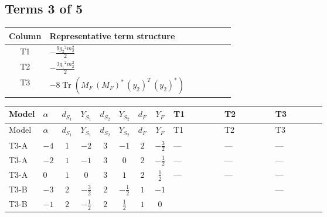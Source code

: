 \documentclass[8pt]{article}
\begin{document}
\begin{landscape}
\subsection*{Terms 3 of 5}
\begin{center}
\begin{tabular}{@{}c >{\raggedright\arraybackslash}p{0.82\linewidth}@{}}
\toprule
Column & Representative term structure \\
\midrule
T1 & \(\displaystyle -\frac{9 {g_2}^2 {m_2^2}}{2}\) \\
\midrule
T2 & \(\displaystyle -\frac{3 {g_1}^2 {m_2^2}}{2}\) \\
\midrule
T3 & \(\displaystyle -8 \operatorname{Tr}\!\left({M_F}\,\left({M_F}\right)^{*}\,\left({y_2}\right)^{T}\,\left({y_2}\right)^{*}\right)\) \\
\midrule
\bottomrule
\end{tabular}
\end{center}
\smallskip
\tiny
\begin{longtable}{@{}llcccccc >{\raggedright\arraybackslash}p{0.21\linewidth} >{\raggedright\arraybackslash}p{0.21\linewidth} >{\raggedright\arraybackslash}p{0.21\linewidth}@{}}
\toprule
Model & $\alpha$ & $d_{S_1}$ & $Y_{S_1}$ & $d_{S_2}$ & $Y_{S_2}$ & $d_F$ & $Y_F$ & T1 & T2 & T3 \\
\midrule
\endfirsthead
\toprule
Model & $\alpha$ & $d_{S_1}$ & $Y_{S_1}$ & $d_{S_2}$ & $Y_{S_2}$ & $d_F$ & $Y_F$ & T1 & T2 & T3 \\
\midrule
\endhead
T3-A & $-4$ & $1$ & $-2$ & $3$ & $-1$ & $2$ & $-\frac{3}{2}$ & --- & --- & --- \\
\midrule
T3-A & $-2$ & $1$ & $-1$ & $3$ & $0$ & $2$ & $-\frac{1}{2}$ & --- & --- & --- \\
\midrule
T3-A & $0$ & $1$ & $0$ & $3$ & $1$ & $2$ & $\frac{1}{2}$ & --- & --- & --- \\
\midrule
T3-B & $-3$ & $2$ & $-\frac{3}{2}$ & $2$ & $-\frac{1}{2}$ & $1$ & $-1$ & \scriptsize\adjustbox{max width=\linewidth}{$\begin{gathered} -\frac{9 {g_2}^2 {m_2^2}}{2}\end{gathered}$} & \scriptsize\adjustbox{max width=\linewidth}{$\begin{gathered} -\frac{3 {g_1}^2 {m_2^2}}{2}\end{gathered}$} & --- \\
\midrule
T3-B & $-1$ & $2$ & $-\frac{1}{2}$ & $2$ & $\frac{1}{2}$ & $1$ & $0$ & \scriptsize\adjustbox{max width=\linewidth}{$\begin{gathered} -\frac{9 {g_2}^2 {m_2^2}}{2}\end{gathered}$} & \scriptsize\adjustbox{max width=\linewidth}{$\begin{gathered} -\frac{3 {g_1}^2 {m_2^2}}{2}\end{gathered}$} & \scriptsize\adjustbox{max width=\linewidth}{$\begin{gathered} -8 \operatorname{Tr}\!\left({M_F}\,\left({M_F}\right)^{*}\,\left({y_2}\right)^{T}\,\left({y_2}\right)^{*}\right)\end{gathered}$} \\

\end{longtable}
\end{landscape}
\end{document}
